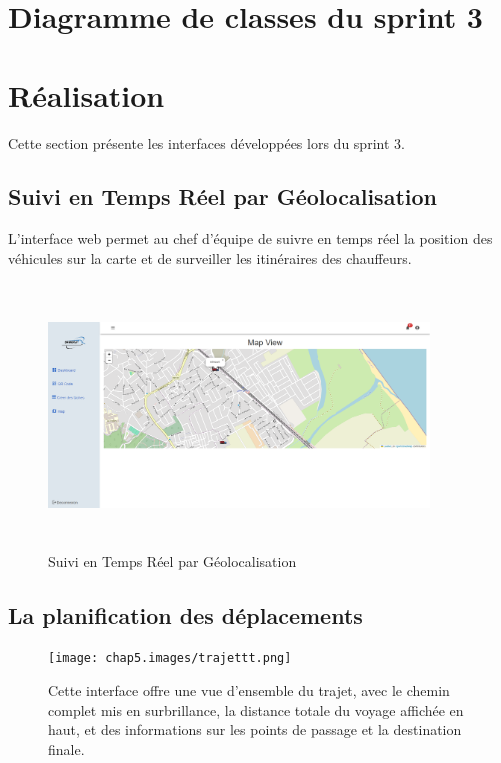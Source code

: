 \newpage
\section{Diagramme de classes du sprint 3}



\newpage
\section{Réalisation}

Cette section présente les interfaces développées lors du sprint 3.

\subsection{Suivi en Temps Réel par Géolocalisation}

L'interface web permet au chef d'équipe de suivre en temps réel la position des véhicules sur la carte et de surveiller les itinéraires des chauffeurs.

\begin{figure}[h!]
    \centering
    \includegraphics[width=0.9\textwidth,height=7cm]{chap5.images/map weeeb.png}
    \caption{Suivi en Temps Réel par Géolocalisation}
\end{figure}

\subsection{La planification des déplacements }

\begin{figure}[htbp]
    \centering
    \begin{minipage}{0.39\textwidth}
        \centering
        \texttt{[image: chap5.images/trajettt.png]}
        \caption{}

    \end{minipage}
    \hfill
    \begin{minipage}{0.58\textwidth}
        \raggedright
        Cette interface offre une vue d'ensemble du trajet, avec le chemin complet mis en surbrillance, la distance totale du voyage affichée en haut, et des informations sur les points de passage et la destination finale.
    \end{minipage}
\end{figure}


